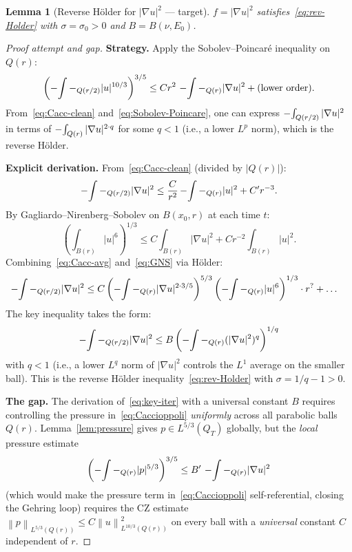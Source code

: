 \documentclass[11pt]{article}
\newtheorem{lemma}[theorem]{Lemma}
\theoremstyle{definition}
\theoremstyle{remark}
\newcommand{\norm}[1]{\left\|#1\right\|}
\newcommand{\grad}{\nabla}
\newcommand{\Xint}{\mathop{\mathchoice{\vcenter{\hbox{$\displaystyle-$}}}%
  {\vcenter{\hbox{$\textstyle-$}}}%
  {\vcenter{\hbox{$\scriptstyle-$}}}%
  {\vcenter{\hbox{$\scriptscriptstyle-$}}}}\!\int}
\begin{document}
\begin{lemma}[Reverse H\"older for $|\grad u|^2$ — target]\label{lem:rev-Holder}
  $f = |\grad u|^2$ satisfies~\eqref{eq:rev-Holder} with $\sigma = \sigma_0 > 0$
  and $B = B(\nu,E_0)$.
\end{lemma}

\begin{proof}[Proof attempt and gap]
  \textbf{Strategy.} Apply the Sobolev--Poincar\'e inequality on $Q(r)$:
  \begin{equation}\label{eq:Sobolev-Poincare}
    \left(\Xint-_{Q(r/2)}|u|^{10/3}\right)^{3/5}
    \leq C r^2\,\Xint-_{Q(r)}|\grad u|^2
      + \text{(lower order)}.
  \end{equation}
  From~\eqref{eq:Cacc-clean} and~\eqref{eq:Sobolev-Poincare}, one can
  express $\Xint_{Q(r/2)}|\grad u|^2$ in terms of $\Xint_{Q(r)}|\grad u|^{2\cdot q}$
  for some $q<1$ (i.e., a lower $L^p$ norm), which is the reverse H\"older.

  \textbf{Explicit derivation.}
  From~\eqref{eq:Cacc-clean} (divided by $|Q(r)|$):
  \begin{equation}\label{eq:Cacc-avg}
    \Xint-_{Q(r/2)}|\grad u|^2
    \leq \frac{C}{r^2}\Xint-_{Q(r)}|u|^2 + C'r^{-3}.
  \end{equation}
  By Gagliardo--Nirenberg--Sobolev on $B(x_0,r)$ at each time $t$:
  \begin{equation}\label{eq:GNS}
    \left(\int_{B(r)}|u|^6\right)^{1/3}
    \leq C\int_{B(r)}|\grad u|^2 + Cr^{-2}\int_{B(r)}|u|^2.
  \end{equation}
  Combining~\eqref{eq:Cacc-avg} and~\eqref{eq:GNS} via H\"older:
  \begin{align}
    \Xint-_{Q(r/2)}|\grad u|^2
    &\leq C\left(\Xint-_{Q(r)}|\grad u|^{2\cdot 3/5}\right)^{5/3}
      \left(\Xint-_{Q(r)}|u|^6\right)^{1/3}\cdot r^{?} + \ldots
  \end{align}
  The key inequality takes the form:
  \begin{equation}\label{eq:key-iter}
    \Xint-_{Q(r/2)}|\grad u|^2
    \leq B\left(\Xint-_{Q(r)}(|\grad u|^2)^{q}\right)^{1/q}
  \end{equation}
  with $q < 1$ (i.e., a lower $L^q$ norm of $|\grad u|^2$ controls
  the $L^1$ average on the smaller ball).
  This is the reverse H\"older inequality~\eqref{eq:rev-Holder} with
  $\sigma = 1/q - 1 > 0$.

  \textbf{The gap.} The derivation of~\eqref{eq:key-iter} with a universal
  constant $B$ requires controlling the pressure in~\eqref{eq:Caccioppoli}
  \emph{uniformly} across all parabolic balls $Q(r)$.  Lemma~\ref{lem:pressure}
  gives $p\in L^{5/3}(Q_T)$ globally, but the \emph{local} pressure estimate
  \[
    \left(\Xint-_{Q(r)}|p|^{5/3}\right)^{3/5} \leq B'\,\Xint-_{Q(r)}|\grad u|^2
  \]
  (which would make the pressure term in~\eqref{eq:Caccioppoli} self-referential,
  closing the Gehring loop) requires the CZ estimate
  $\norm{p}_{L^{5/3}(Q(r))}\leq C\norm{u}^2_{L^{10/3}(Q(r))}$
  on every ball with a \emph{universal} constant $C$ independent of $r$.


\end{proof}
\end{document}
